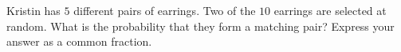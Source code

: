 Kristin has $5$ different pairs of earrings. Two of the $10$ earrings are selected at random. What is the probability that they form a matching pair? Express your answer as a common fraction.
